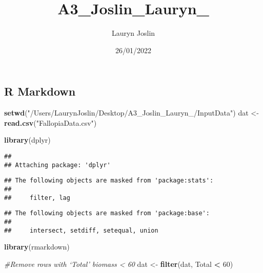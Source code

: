 \documentclass[
]{article}
\title{A3\_Joslin\_Lauryn\_}
\author{Lauryn Joslin}
\date{26/01/2022}
\newenvironment{Shaded}{\begin{snugshade}}{\end{snugshade}}
\newcommand{\CommentTok}[1]{\textcolor[rgb]{0.56,0.35,0.01}{\textit{#1}}}
\newcommand{\DecValTok}[1]{\textcolor[rgb]{0.00,0.00,0.81}{#1}}
\newcommand{\KeywordTok}[1]{\textcolor[rgb]{0.13,0.29,0.53}{\textbf{#1}}}
\newcommand{\NormalTok}[1]{#1}
\newcommand{\OperatorTok}[1]{\textcolor[rgb]{0.81,0.36,0.00}{\textbf{#1}}}
\newcommand{\StringTok}[1]{\textcolor[rgb]{0.31,0.60,0.02}{#1}}
\begin{document}
\maketitle

\hypertarget{r-markdown}{%
\subsection{R Markdown}\label{r-markdown}}

\begin{Shaded}
\begin{Highlighting}[]
\KeywordTok{setwd}\NormalTok{(}\StringTok{"/Users/LaurynJoslin/Desktop/A3_Joslin_Lauryn_/InputData"}\NormalTok{)}
\NormalTok{dat <-}\StringTok{ }\KeywordTok{read.csv}\NormalTok{(}\StringTok{"FallopiaData.csv"}\NormalTok{)}
\end{Highlighting}
\end{Shaded}

\begin{Shaded}
\begin{Highlighting}[]
\KeywordTok{library}\NormalTok{(dplyr)}
\end{Highlighting}
\end{Shaded}

\begin{verbatim}
## 
## Attaching package: 'dplyr'
\end{verbatim}

\begin{verbatim}
## The following objects are masked from 'package:stats':
## 
##     filter, lag
\end{verbatim}

\begin{verbatim}
## The following objects are masked from 'package:base':
## 
##     intersect, setdiff, setequal, union
\end{verbatim}

\begin{Shaded}
\begin{Highlighting}[]
\KeywordTok{library}\NormalTok{(rmarkdown)}
\end{Highlighting}
\end{Shaded}

\begin{Shaded}
\begin{Highlighting}[]
\CommentTok{#Remove rows with ‘Total’ biomass < 60}
\NormalTok{dat <-}\StringTok{ }\KeywordTok{filter}\NormalTok{(dat, Total }\OperatorTok{<}\StringTok{ }\DecValTok{60}\NormalTok{)}
\end{Highlighting}
\end{Shaded}
\end{document}
